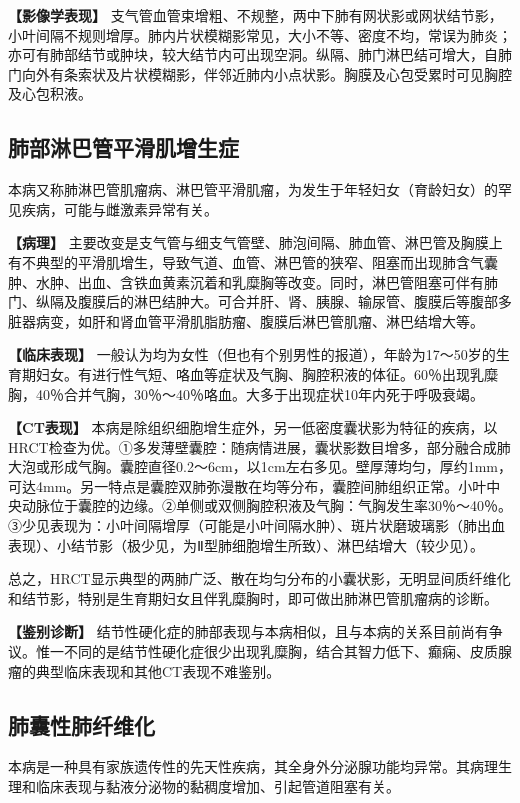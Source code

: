 \textbf{【影像学表现】}
支气管血管束增粗、不规整，两中下肺有网状影或网状结节影，小叶间隔不规则增厚。肺内片状模糊影常见，大小不等、密度不均，常误为肺炎；亦可有肺部结节或肿块，较大结节内可出现空洞。纵隔、肺门淋巴结可增大，自肺门向外有条索状及片状模糊影，伴邻近肺内小点状影。胸膜及心包受累时可见胸腔及心包积液。

\subsection{肺部淋巴管平滑肌增生症}

本病又称肺淋巴管肌瘤病、淋巴管平滑肌瘤，为发生于年轻妇女（育龄妇女）的罕见疾病，可能与雌激素异常有关。

\textbf{【病理】}
主要改变是支气管与细支气管壁、肺泡间隔、肺血管、淋巴管及胸膜上有不典型的平滑肌增生，导致气道、血管、淋巴管的狭窄、阻塞而出现肺含气囊肿、水肿、出血、含铁血黄素沉着和乳糜胸等改变。同时，淋巴管阻塞可伴有肺门、纵隔及腹膜后的淋巴结肿大。可合并肝、肾、胰腺、输尿管、腹膜后等腹部多脏器病变，如肝和肾血管平滑肌脂肪瘤、腹膜后淋巴管肌瘤、淋巴结增大等。

\textbf{【临床表现】}
一般认为均为女性（但也有个别男性的报道），年龄为17～50岁的生育期妇女。有进行性气短、咯血等症状及气胸、胸腔积液的体征。60％出现乳糜胸，40％合并气胸，30％～40％咯血。大多于出现症状10年内死于呼吸衰竭。

\textbf{【CT表现】}
本病是除组织细胞增生症外，另一低密度囊状影为特征的疾病，以HRCT检查为优。①多发薄壁囊腔：随病情进展，囊状影数目增多，部分融合成肺大泡或形成气胸。囊腔直径0.2～6cm，以1cm左右多见。壁厚薄均匀，厚约1mm，可达4mm。另一特点是囊腔双肺弥漫散在均等分布，囊腔间肺组织正常。小叶中央动脉位于囊腔的边缘。②单侧或双侧胸腔积液及气胸：气胸发生率30％～40％。③少见表现为：小叶间隔增厚（可能是小叶间隔水肿）、斑片状磨玻璃影（肺出血表现）、小结节影（极少见，为Ⅱ型肺细胞增生所致）、淋巴结增大（较少见）。

总之，HRCT显示典型的两肺广泛、散在均匀分布的小囊状影，无明显间质纤维化和结节影，特别是生育期妇女且伴乳糜胸时，即可做出肺淋巴管肌瘤病的诊断。

\textbf{【鉴别诊断】}
结节性硬化症的肺部表现与本病相似，且与本病的关系目前尚有争议。惟一不同的是结节性硬化症很少出现乳糜胸，结合其智力低下、癫痫、皮质腺瘤的典型临床表现和其他CT表现不难鉴别。

\subsection{肺囊性肺纤维化}

本病是一种具有家族遗传性的先天性疾病，其全身外分泌腺功能均异常。其病理生理和临床表现与黏液分泌物的黏稠度增加、引起管道阻塞有关。

